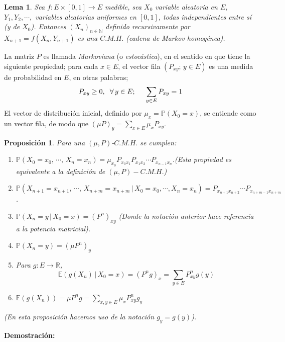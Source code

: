 \documentclass[a4paper]{article}
\newcommand{\prob}{\mathbb{P}}
\newtheorem{lem}{Lema}
\newtheorem{prop}{Proposici\'on}
\numberwithin{equation}{subsection}
\def\R{\mathbb R}
\def\N{\mathbb N}
\def\E{\mathbb E}
\begin{document}
\begin{lem}
\label{Lema 8}
Sea $f:E\times [0,1]\rightarrow E$ medible, sea $X_0$ variable aleatoria en $E$, $Y_1,Y_2,\cdots,$ variables aleatorias uniformes en $[0,1]$, todas independientes entre sí (y de $X_0$). Entonces $\left(X_n\right)_{n\in\N}$ definido recursivamente por $X_{n+1} = f(X_n,Y_{n+1})$ es una $C.M.H.$ (cadena de Markov homogénea).
\end{lem}
 La matriz $P$ es llamada \textit{Markoviana} (o \textit{estocástica}), en el sentido en que tiene la siguiente propiedad; para cada $x\in E$, el vector fila $\left(P_{xy};\,y\in E\right)$ es una medida de probabilidad en $E$, en otras palabras;
 \[P_{xy}\geq 0,\hspace{0.2cm}\forall\,y\in E;\hspace{0.5cm}\sum_{y\in E}P_{xy} = 1\]
 El vector de distribución inicial, definido por $\mu_x = \prob\left(X_0 = x\right)$, se entiende como un vector fila, de modo que $\left(\mu P\right)_y = \sum_{x\in E}\mu_xP_{xy}$.\\ \newline
 
\begin{prop}
Para una $(\mu,P)$-$C.M.H.$ se cumplen:
\begin{enumerate}
    \item[i)] $\prob\left(X_0=x_0,\,\cdots,\,X_n=x_n\right) = \mu_{x_0}P_{x_0x_1}P_{x_1x_2}\cdots P_{x_{n-1}x_n}$.(Esta propiedad es equivalente a la definición de $(\mu,P)-C.M.H.$)
    \item[ii)] $\prob\left(X_{n+1}=x_{n+1},\,\cdots,\,X_{n+m}=x_{n+m}\,|\,X_0=x_0,\cdots,X_n=x_n\right) = P_{x_{n+1}x_{n+2}}\cdots P_{x_{n+m-1}x_{n+m}}$.
    \item[iii)] $\prob\left(X_n=y\,|\,X_0=x\right) = \left(P^n\right)_{xy}$ (Donde la notación anterior hace referencia a la potencia matricial).
    \item[iv)] $\prob\left(X_n = y\right) = \left(\mu P^n \right)_{y}$
    \item[v)] Para $g:E\rightarrow \R$, 
    \[\E\left(g(X_n)\,|\,X_0 = x\right) = \left(P^ng\right)_x = \sum_{y\in E} P^n_{xy} g(y)\]
    \item[vi)] $\E\left(g(X_n)\right) = \mu P^n g = \sum_{x,y\in E}\mu_x P^n_{xy}g_y$
\end{enumerate}
(En esta proposición hacemos uso de la notación $g_y = g(y)$).
\end{prop}

\textbf{Demostración: }\cite[págs. 20,21]{Pard}\\ \newline
\end{document}
